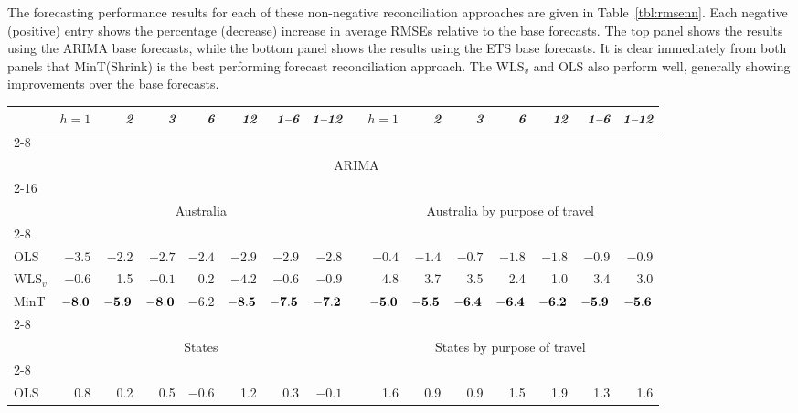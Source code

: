 \documentclass[10pt,a4paper]{article}
\begin{document}
\begin{enumerate}
{  The forecasting performance results for each of these non-negative reconciliation approaches are given in Table~\ref{tbl:rmsenn}. Each negative (positive) entry shows the percentage (decrease) increase in average RMSEs relative to the base forecasts. The top panel shows the results using the ARIMA base forecasts, while the bottom panel shows the results using the ETS base forecasts. It is clear immediately from both panels that MinT(Shrink) is the best performing forecast reconciliation approach. The WLS$_v$ and OLS also perform well, generally showing improvements over the base forecasts.}

  \begin{table*}[!htb]
  \centering\color{blue}
  \fontsize{9}{12}\rm\tabcolsep=0.095cm
  \caption{Out-of-sample forecast performances for Australian domestic tourism flows.}
  \label{tbl:rmsenn}
  \begin{threeparttable}
  \begin{tabular}{lrrrrrrrrrrrrrrr}
  \toprule
  & \it{$h=1$} & \it{2} & \it{3} & \it{6} & \it{12} & \it{1--6} & \it{1--12} & & \it{$h=1$} & \it{2} & \it{3} & \it{6} & \it{12} & \it{1--6} & \it{1--12} \\
  \cline{2-8} \cline{10-16} \\[-0.3cm]
  & \multicolumn{15}{c}{ARIMA} \\
  \cline{2-16} \\[-0.3cm]
  & \multicolumn{7}{c}{Australia} & & \multicolumn{7}{c}{Australia by purpose of travel} \\
  \cline{2-8}\cline{10-16} \\[-0.3cm]
  OLS & $-3.5$ & $-2.2$ & $-2.7$ & $-2.4$ & $-2.9$ & $-2.9$ & $-2.8$ & & $-0.4$ & $-1.4$ & $-0.7$ & $-1.8$ & $-1.8$ & $-0.9$ & $-0.9$ \\
  WLS$_v$ & $-0.6$ & 1.5 & $-0.1$ & 0.2 & $-4.2$ & $-0.6$ & $-0.9$ & & 4.8 & 3.7 & 3.5 & 2.4 & 1.0 & 3.4 & 3.0 \\
  MinT & $\bf{ -8.0}$ & ${\bf -5.9}$ & ${\bf -8.0}$ & ${\bm -6.2}$ & ${\bf -8.5}$ & ${\bf -7.5}$ & ${\bf -7.2}$ & & ${\bf -5.0}$ & ${\bf -5.5}$ & ${\bf -6.4}$ & ${\bf -6.4}$ & ${\bf -6.2}$ & ${\bf -5.9}$ & ${\bf -5.6}$ \\
  \cline{2-8}\cline{10-16} \\[-0.3cm]
  & \multicolumn{7}{c}{States} & & \multicolumn{7}{c}{States by purpose of travel} \\
  \cline{2-8}\cline{10-16} \\[-0.3cm]
  OLS & 0.8 & 0.2 & 0.5 & $-0.6$ & 1.2 & 0.3 & $-0.1$ & & 1.6 & 0.9 & 0.9 & 1.5 & 1.9 & 1.3 & 1.6 \\

\end{tabular}
\end{threeparttable}
\end{table*}
\end{enumerate}
\end{document}
